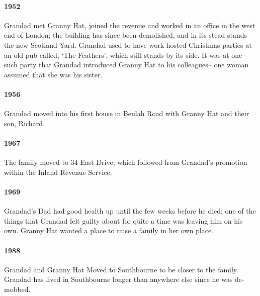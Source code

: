 \documentclass[11pt]{article}
\begin{document}
\paragraph{1952} Grandad met Granny Hat, joined the revenue and worked in an office 
  in the west end of London; the building has since been demolished, and in its stead 
  stands the new Scotland Yard. 
  Grandad used to have work-hosted Christmas parties at an old pub called, `The Feathers', which still stands by its side. 
  It was at one such party that Grandad introduced Granny Hat to his colleagues-- one woman
  assumed that she was his sister.

\paragraph{1956} Grandad moved into his first house in Beulah Road with Granny Hat and their son, Richard.
\paragraph{1967} The family moved to 34 East Drive, which followed from Grandad's promotion within 
the Inland Revenue Service.
\paragraph{1969} Grandad's Dad had good health up until the few weeks before he died; one 
of the things that Grandad felt guilty about for quite a time was leaving him on his own. Granny Hat  wanted 
a place to raise a family in her own place.
\paragraph{1988} Grandad and Granny Hat Moved to Southbourne to be closer to the family. Grandad 
  has lived in Southbourne longer than anywhere else since he was de-mobbed.
\end{document}
